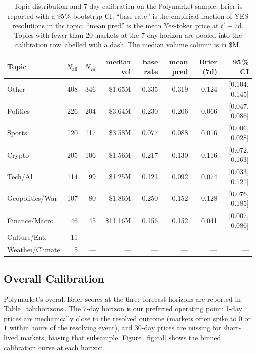 \documentclass{article}
\begin{document}
\begin{table}[t]
  \centering
  \caption{Topic distribution and 7-day calibration on the Polymarket
  sample. Brier is reported with a 95\,\% bootstrap CI; ``base rate''
  is the empirical fraction of YES resolutions in the topic;
  ``mean pred'' is the mean Yes-token price at $t^*-7$d. Topics with
  fewer than 20 markets at the 7-day horizon are pooled into the
  calibration row labelled with a dash. The median volume column
  is in \$M.}
  \label{tab:topics}
  \small
  \begin{tabular}{lrrrrrrr}
    \toprule
    Topic & $N_{\text{all}}$ & $N_{7d}$ & median vol & base rate &
       mean pred & Brier (7d) & 95\,\% CI \\
    \midrule
    Other            & 408 & 346 & \$1.65M & 0.335 & 0.319 & 0.124 & [0.104, 0.145] \\
    Politics         & 226 & 204 & \$3.64M & 0.230 & 0.206 & 0.066 & [0.047, 0.086] \\
    Sports           & 120 & 117 & \$3.58M & 0.077 & 0.088 & 0.016 & [0.006, 0.028] \\
    Crypto           & 205 & 106 & \$1.56M & 0.217 & 0.130 & 0.116 & [0.072, 0.163] \\
    Tech/AI          & 114 &  99 & \$1.25M & 0.121 & 0.092 & 0.074 & [0.033, 0.121] \\
    Geopolitics/War  & 107 &  80 & \$1.86M & 0.250 & 0.152 & 0.128 & [0.076, 0.185] \\
    Finance/Macro    &  46 &  45 & \$11.16M & 0.156 & 0.152 & 0.041 & [0.007, 0.086] \\
    Culture/Ent.     &  11 & --- & ---     & ---   & ---   & ---   & --- \\
    Weather/Climate  &   5 & --- & ---     & ---   & ---   & ---   & --- \\
    \bottomrule
  \end{tabular}
\end{table}

\subsection{Overall Calibration}

Polymarket's overall Brier scores at the three forecast horizons are
reported in Table~\ref{tab:horizons}. The 7-day horizon is our preferred
operating point: 1-day prices are mechanically close to the resolved
outcome (markets often spike to $0$ or $1$ within hours of the
resolving event), and 30-day prices are missing for short-lived
markets, biasing that subsample. Figure~\ref{fig:cal} shows the binned
calibration curve at each horizon.
\end{document}
